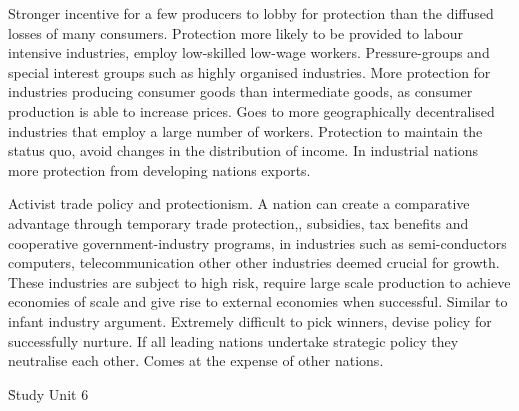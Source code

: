 \documentclass[12pt]{examnotes}
\begin{document}
\ra Stronger incentive for a few producers to lobby for protection than the diffused losses of many consumers.
\ra Protection more likely to be provided to labour intensive industries, employ low-skilled low-wage workers.
\ra Pressure-groups and special interest groups such as highly organised industries.
\ra More protection for industries producing consumer goods than intermediate goods, as consumer production is able to increase prices.
\ra Goes to more geographically decentralised industries that employ a large number of workers.
\ra Protection to maintain the status quo, avoid changes in the distribution of income.
\ra In industrial nations more protection from developing nations exports.

\ra Activist trade policy and protectionism. A nation can create a comparative advantage through temporary trade protection,, subsidies, tax benefits and cooperative government-industry programs, in industries such as semi-conductors computers, telecommunication  other other industries deemed crucial for growth.
\ra These industries are subject to high risk, require large scale production to achieve economies of scale and give rise to external economies when successful.
\ra Similar to infant industry argument.
\ra Extremely difficult to pick winners, devise policy for successfully nurture. 
\ra If all leading nations undertake strategic policy they neutralise each other.
\ra Comes at the expense of other nations.



\h{Study Unit 6}
\end{document}

